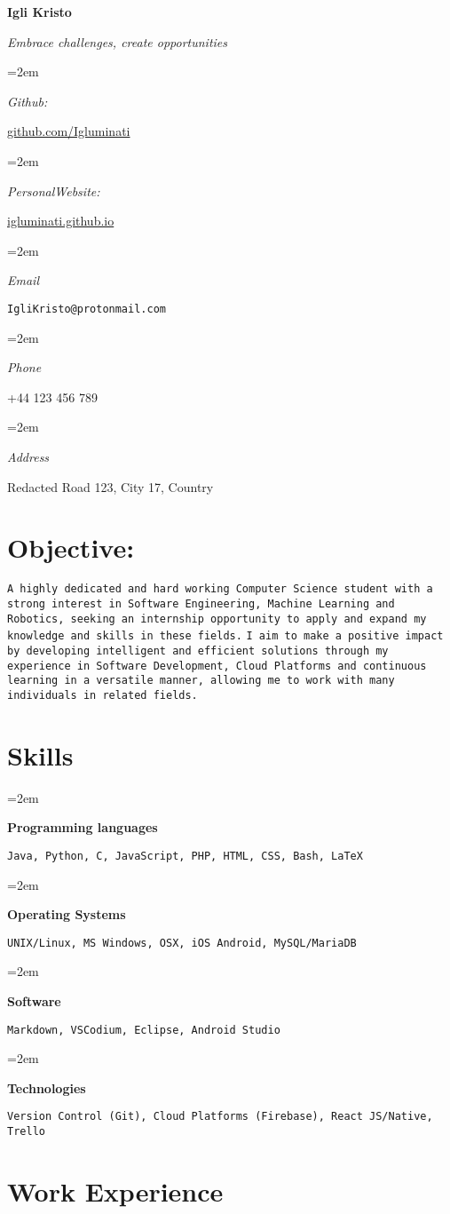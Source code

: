 \documentclass[12pt]{article} %
\newlength{\spacebox}
\newcommand{\sepspace}{\vspace*{1em}}
\newcommand{\name}[1] {
	
	\Huge %
	
	\fontfamily{phv}\selectfont %
	
	
	\begin{center} \textbf{#1} \end{center}\par
	
	
	\normalsize\normalfont
	
}
\newcommand{\motto}[1]{ 
	
	\large %
	
	\fontfamily{phv}\selectfont %
	
	
	\begin{center} \textsl{#1}\end{center}\par
	
	
	\normalsize \normalfont
	
}
\newcommand{\info}[2]{  
	
	
	\noindent\hangindent=2em\hangafter=0 
	
	
	\parbox{\spacebox}{%
		
		\textsl{#1}} %
	
	#2 \par} %
\newcommand{\skill}[2]{ 
	
	
	\noindent\hangindent=2em\hangafter=0
	
	
	\parbox{3\spacebox}{%
		
		\textbf{#1}} %
	
	#2 \par} %
\begin{document}
	
	\name{Igli Kristo} 
	
	\vspace*{-10pt} 
	
	\motto{Embrace challenges, create opportunities}
	
	
	\sepspace 
	\info{Github:}{\href{https://github.com/Igluminati}{github.com/Igluminati}}
	\info{PersonalWebsite:}{\href{https://igluminati.github.io}{igluminati.github.io}}
	\info{Email}{\texttt{IgliKristo@protonmail.com}} 	
	\info{Phone}{+44 123 456 789} 
	\info{Address}{Redacted Road 123, City 17, Country}
	
	
	\section*{Objective:}
	
	\texttt{A highly dedicated and hard working Computer Science student with a strong interest
	in Software Engineering, Machine Learning and Robotics, seeking an internship opportunity to
	apply and expand my knowledge and skills in these fields.}
	\texttt{I aim to make a positive impact by developing intelligent and efficient solutions
		through my experience in Software Development, Cloud Platforms and continuous learning
		 in a versatile manner, allowing me to work with many individuals in related fields.}
	
	
	\section*{Skills}
	
	\skill{Programming languages}{\texttt{Java, Python, C, JavaScript, PHP, HTML, CSS, Bash, \LaTeX}}
	\skill{Operating Systems}{\texttt{UNIX/Linux, MS Windows, OSX, iOS Android, MySQL/MariaDB}}
	\skill{Software}{\texttt{Markdown, VSCodium, Eclipse, Android Studio}} 
	\skill{Technologies}{\texttt{Version Control (Git), Cloud Platforms (Firebase), React JS/Native, Trello}}
	
	
	\section*{Work Experience}
	
	\sepspace
	
\end{document}
